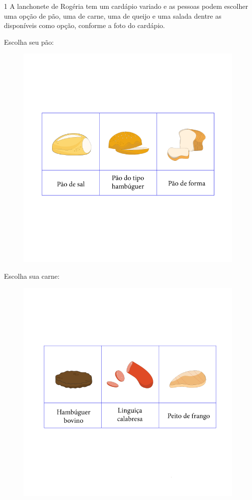 
\num{1} A lanchonete de Rogéria tem um cardápio variado e as pessoas
podem escolher uma opção de pão, uma de carne, uma de queijo e uma
salada dentre as disponíveis como opção, conforme a foto do cardápio.

Escolha seu pão:

\begin{figure}[htpb!]
\includegraphics[width=\textwidth]{../ilustracoes/MAT5/SAEB_5ANO_MAT_figura81a.png}
\end{figure}

Escolha sua carne:

\begin{figure}[htpb!]
\includegraphics[width=\textwidth]{../ilustracoes/MAT5/SAEB_5ANO_MAT_figura81b.png}
\end{figure}

